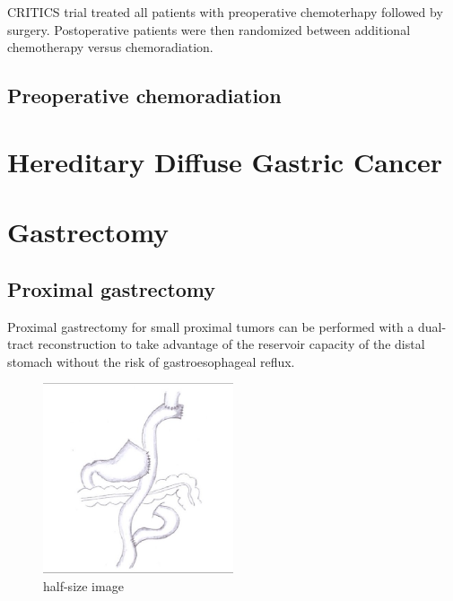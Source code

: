 \documentclass[
]{book}
\begin{document}
CRITICS trial treated all patients with preoperative chemoterhapy followed by surgery. Postoperative patients were then randomized between additional chemotherapy versus chemoradiation.

\hypertarget{preoperative-chemoradiation}{%
\section{Preoperative chemoradiation}\label{preoperative-chemoradiation}}

\citep{ajani3953}

\hypertarget{hereditary-diffuse-gastric-cancer}{%
\chapter{Hereditary Diffuse Gastric Cancer}\label{hereditary-diffuse-gastric-cancer}}

\hypertarget{gastrectomy}{%
\chapter{Gastrectomy}\label{gastrectomy}}

\hypertarget{proximal-gastrectomy}{%
\section{Proximal gastrectomy}\label{proximal-gastrectomy}}

Proximal gastrectomy for small proximal tumors can be performed with a dual-tract reconstruction to take advantage of the reservoir capacity of the distal stomach without the risk of gastroesophageal reflux.

\begin{figure}
\hypertarget{id}{%
\centering
\includegraphics[width=0.5\textwidth,height=0.5\textheight]{images/Double-tract_Q640.jpg}
\caption{half-size image}\label{id}
}
\end{figure}
\end{document}
